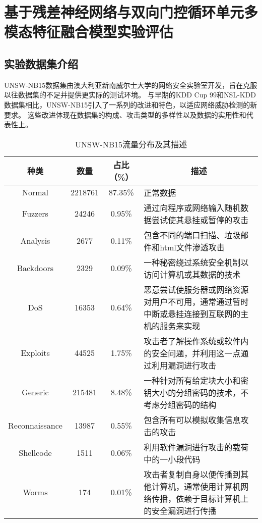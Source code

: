 \section{基于残差神经网络与双向门控循环单元多模态特征融合模型实验评估}
\subsection{实验数据集介绍}
UNSW-NB15数据集\cite{moustafa2015comprehensive}由澳大利亚新南威尔士大学的网络安全实验室开发，旨在克服以往数据集的不足并提供更实际的测试环境。
与早期的KDD Cup 99和NSL-KDD数据集相比，UNSW-NB15引入了一系列的改进和特色，以适应网络威胁检测的新要求。
这些改进体现在数据集的构成、攻击类型的多样性以及数据的实用性和代表性上。

\begin{table}[htbp]
  \caption{UNSW-NB15流量分布及其描述}
  \label{tab:UNSW-NB15_distribution}
  \begin{tabularx}{\textwidth}{@{}cccX@{}}
    \toprule
      \multicolumn{1}{c}{\textbf{种类}} & \multicolumn{1}{c}{\textbf{数量}} & \multicolumn{1}{c}{\textbf{占比（\%）}} & \multicolumn{1}{c}{\textbf{描述}}\\
    \midrule
  Normal & 2218761 & 87.35\% & 正常数据 \\

  Fuzzers & 24246 & 0.95\% & 通过向程序或网络输入随机数据尝试使其悬挂或暂停的攻击 \\

  Analysis & 2677 & 0.11\% & 包含不同的端口扫描、垃圾邮件和html文件渗透攻击 \\

  Backdoors & 2329 & 0.09\% & 一种秘密绕过系统安全机制以访问计算机或其数据的技术 \\

  DoS & 16353 & 0.64\% & 恶意尝试使服务器或网络资源对用户不可用，通常通过暂时中断或悬挂连接到互联网的主机的服务来实现 \\

  Exploits & 44525 & 1.75\% & 攻击者了解操作系统或软件内的安全问题，并利用这一点通过利用漏洞进行攻击 \\

  Generic & 215481 & 8.48\% & 一种针对所有给定块大小和密钥大小的分组密码的技术，不考虑分组密码的结构 \\

  Reconnaissance & 13987 & 0.55\% & 包含所有可以模拟收集信息攻击的攻击 \\

  Shellcode & 1511 & 0.06\% & 利用软件漏洞进行攻击的载荷中的一小段代码 \\

  Worms & 174 & 0.01\% & 攻击者复制自身以便传播到其他计算机，通常使用计算机网络传播，依赖于目标计算机上的安全漏洞进行传播 \\
  \bottomrule
  \end{tabularx}
  \end{table}

